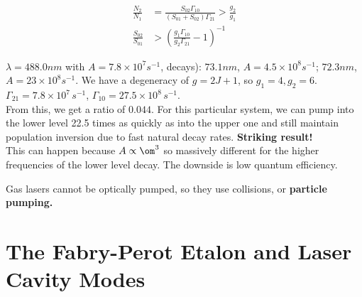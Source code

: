 \documentclass[a4paper, 11pt, normalem]{report}
\begin{document}
\begin{align}
    \frac{N_2}{N_1} &= \frac{S_{02}\Gamma_{10}}{(S_{01}+S_{02})\Gamma_{21}} > \frac{g_2}{g_1} \\
    \frac{S_{02}}{S_{01}} &> \left(\frac{g_1\Gamma_{10}}{g_2\Gamma_{21}}-1\right)^{-1}
\end{align}
\vspace{-25pt}
\begin{example}
    \begin{figure}
        \centering
    \end{figure}
    $\lambda=488.0nm$ with $A = 7.8\times10^7 s^{-1}$, decays): $73.1nm$, $A = 4.5\times10^8 s^{-1}$; $72.3nm$, $A = 23\times10^8 s^{-1}$.
    We have a degeneracy of $g = 2J+1$, so $g_1 = 4, g_2 = 6$.
    $\Gamma_{21} = 7.8\times10^7\,s^{-1}$, $\Gamma_{10}=27.5\times10^8\,s^{-1}$.\\
    From this, we get a ratio of $0.044$.
    For this particular system, we can pump into the lower level 22.5 times as quickly as into the upper one and still maintain population inversion due to fast natural decay rates.
    \textbf{Striking result!}\\
    This can happen because $A \propto \om^3$ so massively different for the higher frequencies of the lower level decay.
    The downside is low quantum efficiency.
\end{example}
Gas lasers cannot be optically pumped, so they use collisions, or \textbf{particle pumping.}

\chapter{The Fabry-Perot Etalon and Laser Cavity Modes}
\end{document}
